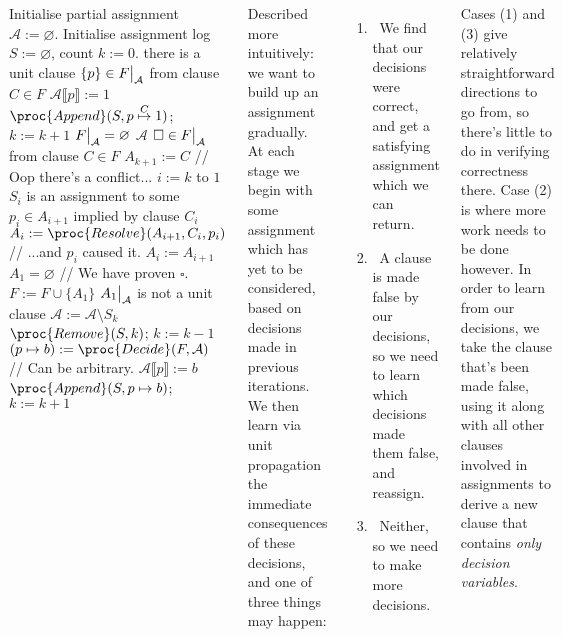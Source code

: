 \documentclass{tikzposter} %
\newcommand\restr[2]{{%
    \left.\kern-\nulldelimiterspace %
      #1 %
      \vphantom{\big|} %
    \right|_{#2} %
  }}
\begin{document}
\begin{columns}
{{      \begin{codebox}
      \li Initialise partial assignment $\mathcal{A} := \varnothing$.
      \li Initialise assignment log $S := \varnothing$, count $k := 0$.
      \li \While {} \Do
      \li   \While there is a unit clause $\{p\} \in \restr{F}{\mathcal{A}}$ from clause $C \in F$ \Do
      \li     $\mathcal{A} \llbracket p \rrbracket := 1$
      \li     $\proc{Append}(S, p \overset{C}{\mapsto} 1)$; $k := k+1$
            \End
      \li   \If $\restr{F}{\mathcal{A}} = \varnothing$ \Then
      \li     \Return $\mathcal{A}$
      \li   \ElseIf $\square \in \restr{F}{\mathcal{A}}$ from clause $C \in F$ \Then
      \li     $A_{k+1} := C$ \>\>\>\>\>\>\>\>\>\>\>\> // Oop there's a conflict...
      \li     \For $i := k$ to $1$ \Do
      \li       \If $S_{i}$ is an assignment to some $p_{i} \in A_{i+1}$ implied by clause $C_{i}$ \Then
      \li         $A_{i} := \proc{Resolve}(A_{i+1}, C_{i}, p_{i})$ \>\>\>\>\> // ...and $p_{i}$ caused it.
      \li       \Else
      \li         $A_{i} := A_{i+1}$
                \End
              \End
      \li     \If $A_{1} = \varnothing$ \Then
      \li        \Return {} \>\>\>\>\>\>\>\>\>\> // We have proven $\square$.
      \li     \Else
      \li       $F := F \cup  \{A_{1}\}$ \>\>\>\>\>
      \li       \While $\restr{A_{1}}{\mathcal{A}}$ is not a unit clause \Do
      \li         $\mathcal{A} := \mathcal{A} \setminus S_{k}$
      \li         $\proc{Remove}(S,k)$; $k := k -1$
                \End
              \End
      \li   \Else
      \li     $(p \mapsto b) := \proc{Decide}(F, \mathcal{A})$ \>\>\>\>\>\>\>\>\>\> // Can be arbitrary.
      \li     $\mathcal{A} \llbracket p \rrbracket := b$
      \li     $\proc{Append}(S,p \mapsto b)$; $k := k+1$
            \End
          \End
      \end{codebox}

      Described more intuitively: we want to build up an assignment gradually. At each stage we begin with some assignment which has yet to be considered, based on decisions made in previous iterations. We then learn via unit propagation the immediate consequences of these decisions, and one of three things may happen:
      \begin{enumerate}
              \item \ We find that our decisions were correct, and get a satisfying assignment which we can return.
              \item \ A clause is made false by our decisions, so we need to learn which decisions made them false, and reassign.
              \item \ Neither, so we need to make more decisions.
      \end{enumerate}
      Cases (1) and (3) give relatively straightforward directions to go from, so there's little to do in verifying correctness there. Case (2) is where more work needs to be done however. In order to learn from our decisions, we take the clause that's been made false, using it along with all other clauses involved in assignments to derive a new clause that contains \emph{only decision variables}. \\

}}
\end{columns}
\end{document}
